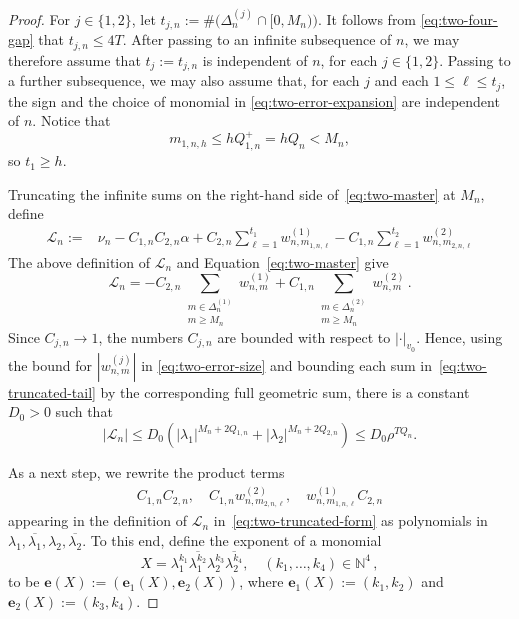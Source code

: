 \documentclass[a4paper,UKenglish,cleveref, autoref, thm-restate]{lipics-v2021}
\begin{document}
\begin{proof}
For \(j\in\{1,2\}\), let
\(
  t_{j,n}
  :=
  \#\bigl(\Delta_n^{(j)}\cap[0,M_n)\bigr)
\).
It follows from \eqref{eq:two-four-gap} that
\(
  t_{j,n}\le 4T\).
After passing to an infinite subsequence of \(n\), we may therefore
assume that \(t_j:=t_{j,n}\) is independent of \(n\), for each
\(j\in\{1,2\}\). Passing to a further subsequence, we may also assume
that, for each \(j\) and each \(1\le \ell\le t_j\), the sign and the
choice of monomial in \eqref{eq:two-error-expansion} are independent of \(n\).
Notice that
\[
  m_{1,n,h}\le hQ_{1,n}^+=hQ_n<M_n,
\]
so \(t_1\ge h\).

Truncating the infinite sums on the right-hand side of~\eqref{eq:two-master} at \(M_n\), define
\begin{equation}\label{eq:two-truncated-form}
\begin{split}
  \mathcal L_n
  :={}&
  \nu_n-C_{1,n}C_{2,n}\alpha
  +C_{2,n}
  \sum_{\ell=1}^{t_1}
  w_{n,m_{1,n,\ell}}^{(1)} - C_{1,n} \sum_{\ell=1}^{t_2}
  w_{n,m_{2,n,\ell}}^{(2)}
\end{split}
\end{equation}
The above definition of $\mathcal L_n$ and Equation~\eqref{eq:two-master} give
\begin{equation}\label{eq:two-truncated-tail}
  \mathcal L_n
  = - C_{2,n}
  \sum_{\substack{m\in\Delta_n^{(1)}\\m\ge M_n}}
  w_{n,m}^{(1)} + C_{1,n}
  \sum_{\substack{m\in\Delta_n^{(2)}\\m\ge M_n}}
  w_{n,m}^{(2)} \, .
\end{equation}
Since \(C_{j,n}\to1\), the numbers \(C_{j,n}\) are bounded
with respect to \(|\cdot|_{v_0}\). Hence, using the bound for $|w_{n,m}^{(j)}|$ in \eqref{eq:two-error-size} and bounding each
sum in~\eqref{eq:two-truncated-tail} by the corresponding full geometric sum, there is a
constant \(D_0>0\) such that
\begin{equation}\label{eq:two-tail-estimate}
  |\mathcal L_n|
  \le
  D_0(
  |\lambda_1|^{M_n+2Q_{1,n}}+|\lambda_2|^{M_n+2Q_{2,n}})
  \le
  D_0\rho^{TQ_n}.
\end{equation}

As a next step, we rewrite the product terms 
\begin{gather} 
\label{eq:exponents}
C_{1,n}C_{2,n},\quad C_{1,n}w_{n,m_{2,n,\ell}}^{(2)}, \quad w^{(1)}_{n,m_{1,n,\ell}}C_{2,n} 
\end{gather}
appearing in the definition of $\mathcal L_n$ in~\eqref{eq:two-truncated-form} as polynomials in 
$\lambda_1,\overline{\lambda_1},\lambda_2,\overline{\lambda_2}$.   
To this end, define the exponent of a monomial
\[X=\lambda_1^{k_1}\overline{\lambda_1^{k_2}}\lambda_2^{k_3}\overline{\lambda_2^{k_4}},\quad (k_1,\ldots,k_4) \in \mathbb N^4\, , \] to be
$\mathbf e(X):=(\mathbf e_1(X),\mathbf e_2(X))$, where $\mathbf e_1(X):=(k_1,k_2)$ and $\mathbf e_2(X):=(k_3,k_4)$.


\end{proof}
\end{document}
